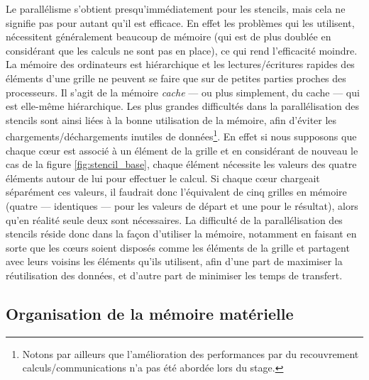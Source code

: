 Le parallélisme s'obtient presqu'immédiatement pour les stencils, mais cela ne signifie pas pour autant qu'il est efficace. En effet les problèmes qui les utilisent, nécessitent généralement beaucoup de mémoire (qui est de plus doublée en considérant que les calculs ne sont pas en place), ce qui rend l'efficacité moindre. La mémoire des ordinateurs est hiérarchique et les lectures/écritures rapides des éléments d'une grille ne peuvent se faire que sur de petites parties proches des processeurs. Il s'agit de la mémoire \emph{cache} --- ou plus simplement, du cache --- qui est elle-même hiérarchique. Les plus grandes difficultés dans la parallélisation des stencils sont ainsi liées à la bonne utilisation de la mémoire, afin d'éviter les chargements/déchargements inutiles de données\footnote{Notons par ailleurs que l'amélioration des performances par du recouvrement calculs/communications n'a pas été abordée lors du stage.}. En effet si nous supposons que chaque cœur est associé à un élément de la grille et en considérant de nouveau le cas de la figure \ref{fig:stencil_base}, chaque élément nécessite les valeurs des quatre éléments autour de lui pour effectuer le calcul. Si chaque cœur chargeait séparément ces valeurs, il faudrait donc l'équivalent de cinq grilles en mémoire (quatre --- identiques --- pour les valeurs de départ et une pour le résultat), alors qu'en réalité seule deux sont nécessaires. La difficulté de la parallélisation des stencils réside donc dans la façon d'utiliser la mémoire, notamment en faisant en sorte que les cœurs soient disposés comme les éléments de la grille et partagent avec leurs voisins les éléments qu'ils utilisent, afin d'une part de maximiser la réutilisation des données, et d'autre part de minimiser les temps de transfert.

\subsection{Organisation de la mémoire matérielle}

